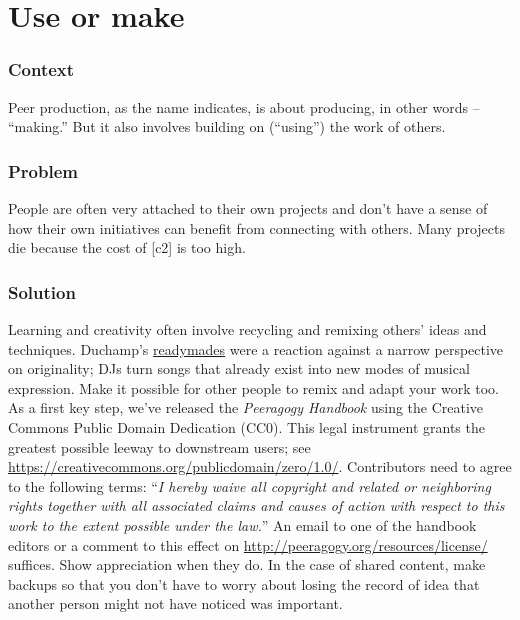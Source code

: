 \begingroup \color{BurntOrange}

\section{Use or make}\label{sec:Use_or_make}
\subsubsection*{Context}
Peer production, as the name indicates, is about producing, in other words --
``making.'' But it also involves building on (``using'') the work of others.

\subsubsection*{Problem}
People are often very attached to their own projects and don't have a sense of how their own initiatives can benefit from connecting with others. Many projects die because the cost of  [c2] is too high.

\subsubsection*{Solution} Learning and creativity often involve recycling and remixing others' ideas and techniques.   Duchamp's {\href{https://en.wikipedia.org/w/index.php?title=Readymades_of_Marcel_Duchamp&oldid=660437742}{readymades}} were a reaction against a narrow perspective on originality; DJs turn songs that already exist into new modes of musical expression.  Make it possible for other people to remix and adapt your work too.  As a first key step, we've released the \emph{Peeragogy Handbook} using the Creative Commons Public Domain Dedication (CC0).  This legal instrument grants the greatest possible leeway to downstream users; see \url{https://creativecommons.org/publicdomain/zero/1.0/}.  Contributors need to agree to the following terms: ``\emph{I hereby waive all copyright and related or neighboring rights together with all associated claims and causes of action with respect to this work to the extent possible under the law.}''  An email to one of the handbook editors or a comment to this effect on \url{http://peeragogy.org/resources/license/} suffices.  Show appreciation when they do.  In the case of shared content, make backups so that you don't have to worry about losing the record of idea that another person might not have noticed was important.

